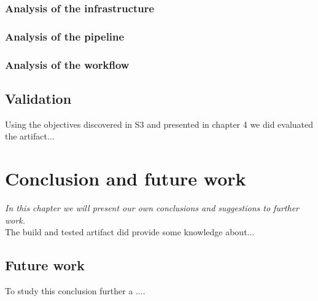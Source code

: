 \documentclass[a4paper,12pt]{article} %
\begin{document}
\subsubsection{Analysis of the infrastructure}

\subsubsection{Analysis of the pipeline}

\subsubsection{Analysis of the workflow}

\subsection{Validation}
Using the objectives discovered in S3 and presented in chapter 4 we did evaluated the artifact...

\newpage
\section{Conclusion and future work}
\emph{In this chapter we will present our own conclusions and suggestions to further work.}\\
The build and tested artifact did provide some knowledge about...

\subsection{Future work}
To study this conclusion further a ....

\newpage

\newpage


\newpage

\setcounter{page}{1} %
\appendix
\end{document}
